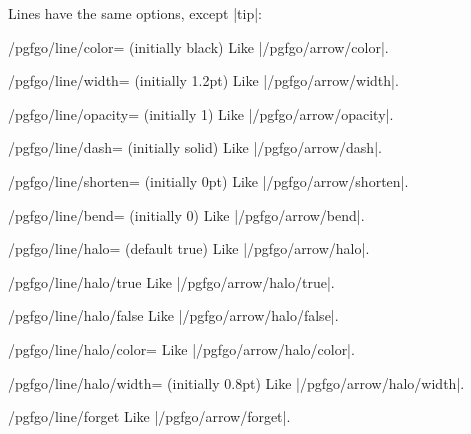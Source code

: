 Lines have the same options, except |tip|:

\begin{key}{/pgfgo/line/color= (initially black)}
	Like |/pgfgo/arrow/color|.
\end{key}

\begin{key}{/pgfgo/line/width= (initially 1.2pt)}
	Like |/pgfgo/arrow/width|.
\end{key}

\begin{key}{/pgfgo/line/opacity= (initially 1)}
	Like |/pgfgo/arrow/opacity|.
\end{key}

\begin{key}{/pgfgo/line/dash= (initially solid)}
	Like |/pgfgo/arrow/dash|.
\end{key}

\begin{key}{/pgfgo/line/shorten= (initially 0pt)}
	Like |/pgfgo/arrow/shorten|.
\end{key}

\begin{key}{/pgfgo/line/bend= (initially 0)}
	Like |/pgfgo/arrow/bend|.
\end{key}

\begin{key}{/pgfgo/line/halo= (default true)}
	Like |/pgfgo/arrow/halo|.
\end{key}

\begin{stylekey}{/pgfgo/line/halo/true}
	Like |/pgfgo/arrow/halo/true|.
\end{stylekey}

\begin{stylekey}{/pgfgo/line/halo/false}
	Like |/pgfgo/arrow/halo/false|.
\end{stylekey}

\begin{key}{/pgfgo/line/halo/color=}
	Like |/pgfgo/arrow/halo/color|.
\end{key}

\begin{key}{/pgfgo/line/halo/width= (initially 0.8pt)}
	Like |/pgfgo/arrow/halo/width|.
\end{key}

\begin{key}{/pgfgo/line/forget}
	Like |/pgfgo/arrow/forget|.
\end{key}

